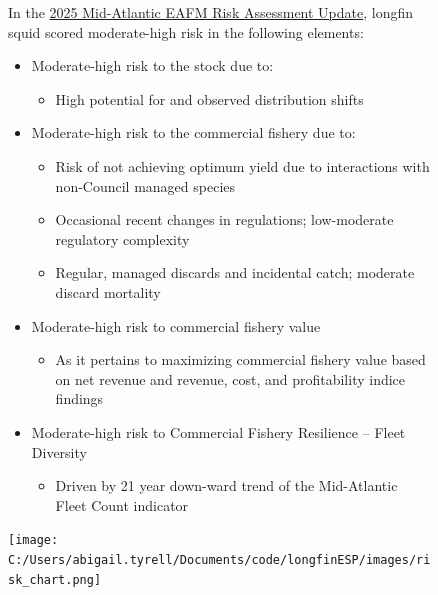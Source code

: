 \documentclass[
  9pt,
  letterpaper,
  DIV=11,
  numbers=noendperiod]{scrartcl}
\providecommand{\tightlist}{%
  \setlength{\itemsep}{0pt}\setlength{\parskip}{0pt}}\usepackage{longtable,booktabs,array}
\begin{document}
\begin{figure}
\begin{minipage}{0.40\linewidth}
\raggedright

In the
\href{https://static1.squarespace.com/static/511cdc7fe4b00307a2628ac6/t/67d45b1680e8654ecaf1b98e/1741970199497/b_Draft+MAB_RiskAssess_2025.pdf}{2025
Mid-Atlantic EAFM Risk Assessment Update}, longfin squid scored
moderate-high risk in the following elements:

\begin{itemize}
\tightlist
\item
  Moderate-high risk to the stock due to:

  \begin{itemize}
  \tightlist
  \item
    High potential for and observed distribution shifts\\
  \end{itemize}
\item
  Moderate-high risk to the commercial fishery due to:

  \begin{itemize}
  \tightlist
  \item
    Risk of not achieving optimum yield due to interactions with
    non-Council managed species
  \item
    Occasional recent changes in regulations; low-moderate regulatory
    complexity
  \item
    Regular, managed discards and incidental catch; moderate discard
    mortality
  \end{itemize}
\item
  Moderate-high risk to commercial fishery value

  \begin{itemize}
  \tightlist
  \item
    As it pertains to maximizing commercial fishery value based on net
    revenue and revenue, cost, and profitability indice findings
  \end{itemize}
\item
  Moderate-high risk to Commercial Fishery Resilience -- Fleet Diversity

  \begin{itemize}
  \tightlist
  \item
    Driven by 21 year down-ward trend of the Mid-Atlantic Fleet Count
    indicator
  \end{itemize}
\end{itemize}

\vspace{0.25cm}

\texttt{[image: C:/Users/abigail.tyrell/Documents/code/longfinESP/images/risk\_chart.png]}

\end{minipage}%

\end{figure}%
\end{document}
